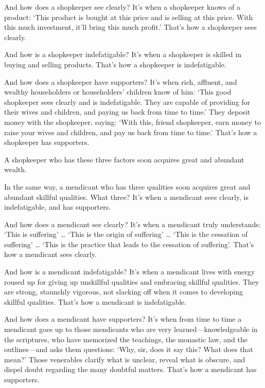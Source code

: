 \documentclass[12pt,openany]{book}%
\begin{document}
And how does a shopkeeper see clearly? It’s when a shopkeeper knows of a product: ‘This product is bought at this price and is selling at this price. With this much investment, it’ll bring this much profit.’ That’s how a shopkeeper sees clearly. 

And how is a shopkeeper indefatigable? It’s when a shopkeeper is skilled in buying and selling products. That’s how a shopkeeper is indefatigable. 

And how does a shopkeeper have supporters? It’s when rich, affluent, and wealthy householders or householders’ children know of him: ‘This good shopkeeper sees clearly and is indefatigable. They are capable of providing for their wives and children, and paying us back from time to time.’ They deposit money with the shopkeeper, saying: ‘With this, friend shopkeeper, earn money to raise your wives and children, and pay us back from time to time.’ That’s how a shopkeeper has supporters. 

A shopkeeper who has these three factors soon acquires great and abundant wealth. 

In the same way, a mendicant who has three qualities soon acquires great and abundant skillful qualities. What three? It’s when a mendicant sees clearly, is indefatigable, and has supporters. 

And how does a mendicant see clearly? It’s when a mendicant truly understands: ‘This is suffering’ … ‘This is the origin of suffering’ … ‘This is the cessation of suffering’ … ‘This is the practice that leads to the cessation of suffering’. That’s how a mendicant sees clearly. 

And how is a mendicant indefatigable? It’s when a mendicant lives with energy roused up for giving up unskillful qualities and embracing skillful qualities. They are strong, staunchly vigorous, not slacking off when it comes to developing skillful qualities. That’s how a mendicant is indefatigable. 

And how does a mendicant have supporters? It’s when from time to time a mendicant goes up to those mendicants who are very learned—knowledgeable in the scriptures, who have memorized the teachings, the monastic law, and the outlines—and asks them questions: ‘Why, sir, does it say this? What does that mean?’ Those venerables clarify what is unclear, reveal what is obscure, and dispel doubt regarding the many doubtful matters. That’s how a mendicant has supporters. 
\end{document}
